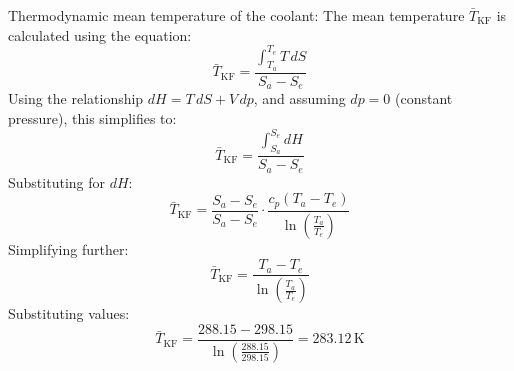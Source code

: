 Thermodynamic mean temperature of the coolant:  
The mean temperature \( \bar{T}_{\text{KF}} \) is calculated using the equation:  
\[
\bar{T}_{\text{KF}} = \frac{\int_{T_a}^{T_e} T \, dS}{S_a - S_e}
\]  
Using the relationship \( dH = T \, dS + V \, dp \), and assuming \( dp = 0 \) (constant pressure), this simplifies to:  
\[
\bar{T}_{\text{KF}} = \frac{\int_{S_a}^{S_e} dH}{S_a - S_e}
\]  
Substituting for \( dH \):  
\[
\bar{T}_{\text{KF}} = \frac{S_a - S_e}{S_a - S_e} \cdot \frac{c_p (T_a - T_e)}{\ln \left( \frac{T_a}{T_e} \right)}
\]  
Simplifying further:  
\[
\bar{T}_{\text{KF}} = \frac{T_a - T_e}{\ln \left( \frac{T_a}{T_e} \right)}
\]  
Substituting values:  
\[
\bar{T}_{\text{KF}} = \frac{288.15 - 298.15}{\ln \left( \frac{288.15}{298.15} \right)} = 283.12 \, \text{K}
\]